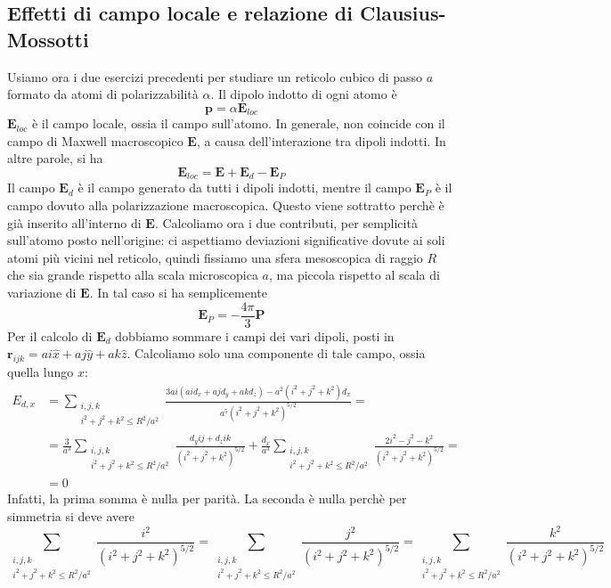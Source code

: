 \documentclass[a4paper,11pt]{book}
\renewcommand{\vec}[1]{\mathbf{#1}}
\theoremstyle{theorem}
\theoremstyle{definition}
\begin{document}
\subsection{Effetti di campo locale e relazione di Clausius-Mossotti}
Usiamo ora i due esercizi precedenti per studiare un reticolo cubico di passo $a$ formato da atomi di polarizzabilità $\alpha$. Il dipolo indotto di ogni atomo è
\[\vec{p}=\alpha\vec{E}_{loc}\]
$\vec{E}_{loc}$ è il campo locale, ossia il campo sull'atomo. In generale, non coincide con il campo di Maxwell macroscopico $\vec{E}$, a causa dell'interazione tra dipoli indotti. In altre parole, si ha
\[\vec{E}_{loc}=\vec{E}+\vec{E}_d-\vec{E}_P\]
Il campo $\vec{E}_d$ è il campo generato da tutti i dipoli indotti, mentre il campo $\vec{E}_P$ è il campo dovuto alla polarizzazione macroscopica. Questo viene sottratto perchè è già inserito all'interno di $\vec{E}$. Calcoliamo ora i due contributi, per semplicità sull'atomo posto nell'origine: ci aspettiamo deviazioni significative dovute ai soli atomi più vicini nel reticolo, quindi fissiamo una sfera mesoscopica di raggio $R$ che sia grande rispetto alla scala microscopica $a$, ma piccola rispetto al scala di variazione di $\vec{E}$. In tal caso si ha semplicemente
\[\vec{E}_P=-\frac{4\pi}{3}\vec{P}\]
Per il calcolo di $\vec{E}_d$ dobbiamo sommare i campi dei vari dipoli, posti in $\vec{r}_{ijk}=ai\hat{x}+aj\hat{y}+ak\hat{z}$. Calcoliamo solo una componente di tale campo, ossia quella lungo $x$:
\begin{align*}
	E_{d,x}&=\sum_{\substack{i,j,k\\i^2+j^2+k^2\leq R^2/a^2}}\frac{3ai(aid_x+ajd_y+akd_z)-a^2(i^2+j^2+k^2)d_x}{a^5(i^2+j^2+k^2)^{5/2}}=\\&=\frac{3}{a^3}\sum_{\substack{i,j,k\\i^2+j^2+k^2\leq R^2/a^2}}\frac{d_yij+d_zik}{(i^2+j^2+k^2)^{5/2}}+\frac{d_x}{a^3}\sum_{\substack{i,j,k\\i^2+j^2+k^2\leq R^2/a^2}}\frac{2i^2-j^2-k^2}{(i^2+j^2+k^2)^{5/2}}=\\&=0
\end{align*}
Infatti, la prima somma è nulla per parità. La seconda è nulla perchè per simmetria si deve avere
\[\sum_{\substack{i,j,k\\i^2+j^2+k^2\leq R^2/a^2}}\frac{i^2}{(i^2+j^2+k^2)^{5/2}}=\sum_{\substack{i,j,k\\i^2+j^2+k^2\leq R^2/a^2}}\frac{j^2}{(i^2+j^2+k^2)^{5/2}}=\sum_{\substack{i,j,k\\i^2+j^2+k^2\leq R^2/a^2}}\frac{k^2}{(i^2+j^2+k^2)^{5/2}}\]
\end{document}

